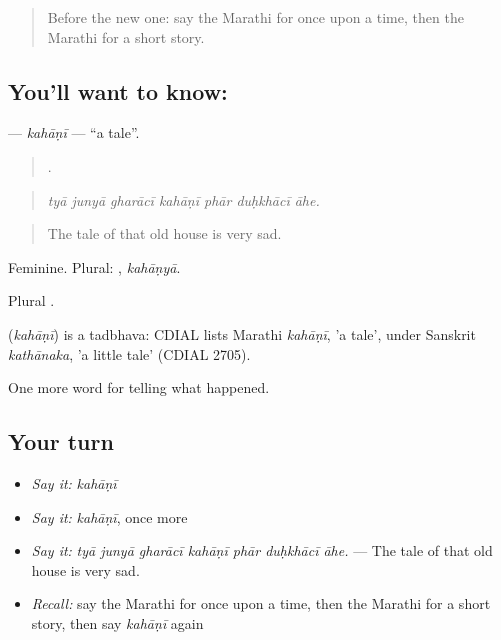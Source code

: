 \label{lesson:MR-C303-kahani}



\begin{quote}
Before the new one: say the Marathi for once upon a time, then the Marathi for a short story.
\end{quote}

\subsection*{You'll want to know: }
\textbf{} — \emph{kahāṇī} — \textquotedblleft{}a tale\textquotedblright{}.

\begin{quote}
      .
\end{quote}

\begin{quote}
\emph{tyā junyā gharācī kahāṇī phār duḥkhācī āhe.}
\end{quote}

\begin{quote}
The tale of that old house is very sad.
\end{quote}

Feminine. Plural: , \emph{kahāṇyā}.

Plural .

\begin{cousinweb}
\textbf{} (\emph{kahāṇī}) is a tadbhava: CDIAL lists Marathi \emph{kahāṇī}, 'a tale', under Sanskrit \emph{kathānaka}, 'a little tale' (CDIAL 2705).
\end{cousinweb}

\begin{grammarlens}[title={What you've built}]
One more word for telling what happened.
\end{grammarlens}

\subsection*{Your turn}
\begin{itemize}
\raggedright
  \item \emph{Say it:} \emph{kahāṇī}
  \item \emph{Say it:} \emph{kahāṇī}, once more
  \item \emph{Say it:} \emph{tyā junyā gharācī kahāṇī phār duḥkhācī āhe.} — The tale of that old house is very sad.
  \item \emph{Recall:} say the Marathi for once upon a time, then the Marathi for a short story, then say \emph{kahāṇī} again
\end{itemize}

